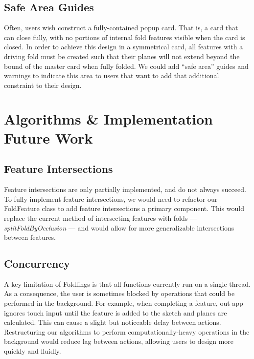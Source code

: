 \subsection{Safe Area Guides}\label{safe-area-guides}

Often, users wish construct a fully-contained popup card. That is, a
card that can close fully, with no portions of internal fold features
visible when the card is closed. In order to achieve this design in a
symmetrical card, all features with a driving fold must be created such
that their planes will not extend beyond the bound of the master card
when fully folded. We could add ``safe area'' guides and warnings to
indicate this area to users that want to add that additional constraint
to their design.

\section{Algorithms \& Implementation Future
Work}\label{algorithms-implementation-future-work}

\subsection{Feature Intersections}\label{feature-intersections}

Feature intersections are only partially implemented, and do not always
succeed. To fully-implement feature intersections, we would need to
refactor our FoldFeature class to add feature intersections a primary
component. This would replace the current method of intersecting
features with folds --- \emph{splitFoldByOcclusion} --- and would allow
for more generalizable intersections between features.

\subsection{Concurrency}\label{concurrency}

A key limitation of Foldlings is that all functions currently run on a
single thread. As a consequence, the user is sometimes blocked by
operations that could be performed in the background. For example, when
completing a feature, out app ignores touch input until the feature is
added to the sketch and planes are calculated. This can cause a slight
but noticeable delay between actions. Restructuring our algorithms to
perform computationally-heavy operations in the background would reduce
lag between actions, allowing users to design more quickly and fluidly.
